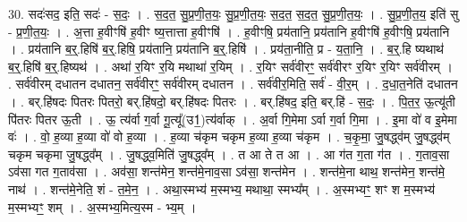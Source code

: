 \documentclass[17pt]{extarticle}
\begin{document}
30. सदः॑सद॒ इति॒ सदः॑ - स॒दः॒ । . स॒द॒त॒ सु॒प्र॒णी॒त॒यः॒ सु॒प्र॒णी॒त॒यः॒ स॒द॒त॒ स॒द॒त॒ सु॒प्र॒णी॒त॒यः॒ । . सु॒प्र॒णी॒त॒य॒ इति॑ सु - प्र॒णी॒त॒यः॒ । . अ॒त्ता ह॒वीꣳषि॑ ह॒वीꣳ ष्य॒त्तात्ता ह॒वीꣳषि॑ । . ह॒वीꣳषि॒ प्रय॑तानि॒ प्रय॑तानि ह॒वीꣳषि॑ ह॒वीꣳषि॒ प्रय॑तानि । . प्रय॑तानि ब॒र्॒.हिषि॑ ब॒र्॒.हिषि॒ प्रय॑तानि॒ प्रय॑तानि ब॒र्॒.हिषि॑ । . प्रय॑ता॒नीति॒ प्र - य॒ता॒नि॒ । . ब॒र्॒.हि ष्यथाथ॑ ब॒र्॒.हिषि॑ ब॒र्॒.हिष्यथ॑ । . अथा॑ र॒यिꣳ र॒यि मथाथा॑ र॒यिम् । . र॒यिꣳ सर्व॑वीरꣳ॒॒ सर्व॑वीरꣳ र॒यिꣳ र॒यिꣳ सर्व॑वीरम् । . सर्व॑वीरम् दधातन दधातन॒ सर्व॑वीरꣳ॒॒ सर्व॑वीरम् दधातन । . सर्व॑वीर॒मिति॒ सर्व॑ - वी॒र॒म् । . द॒धा॒त॒नेति॑ दधातन । . बर्.हि॑षदः पितरः पितरो॒ बर्.हि॑षदो॒ बर्.हि॑षदः पितरः । . बर्.हि॑षद॒ इति॒ बर्.हि॑ - स॒दः॒ । . पि॒त॒र॒ ऊ॒त्यू॑ती पि॑तरः पितर ऊ॒ती । . ऊ॒ त्य॑र्वा ग॒र्वा गू॒त्यू᳚(उ1॒)त्य॑र्वाक् । . अ॒र्वा गि॒मेमा ऽर्वा ग॒र्वा गि॒मा । . इ॒मा वो॑ व इ॒मेमा वः॑ । . वो॒ ह॒व्या ह॒व्या वो॑ वो ह॒व्या । . ह॒व्या च॑कृम चकृम ह॒व्या ह॒व्या च॑कृम । . च॒कृ॒मा॒ जु॒षद्ध्व॑म् जु॒षद्ध्व॑म् चकृम चकृमा जु॒षद्ध्व᳚म् । . जु॒षद्ध्व॒मिति॑ जु॒षद्ध्व᳚म् । . त आ ते त आ । . आ ग॑त ग॒ता ग॑त । . ग॒ताव॒सा ऽव॑सा गत ग॒ताव॑सा । . अव॑सा॒ शन्त॑मेन॒ शन्त॑मे॒नाव॒सा ऽव॑सा॒ शन्त॑मेन । . शन्त॑मे॒ना थाथ॒ शन्त॑मेन॒ शन्त॑मे॒ नाथ॑ । . शन्त॑मे॒नेति॒ शं - त॒मे॒न॒ । . अथा॒स्मभ्य॑ म॒स्मभ्य॒ मथाथा॒ स्मभ्य᳚म् । . अ॒स्मभ्यꣳ॒॒ शꣳ श म॒स्मभ्य॑ म॒स्मभ्यꣳ॒॒ शम् । . अ॒स्मभ्य॒मित्य॒स्म - भ्य॒म् । \newline
\end{document}

